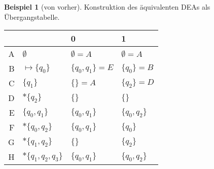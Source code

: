 \documentclass[11pt]{article} %
\theoremstyle{definition}
\newtheorem*{beispiel}{Beispiel}
\begin{document}
\begin{beispiel}[von vorher]
Konstruktion des äquivalenten DEAs als Übergangstabelle.

\begin{tabular}{rl|ll}
&& 0 & 1\\
\hline
A&$\emptyset$ & $\emptyset = A$ & $\emptyset = A$   \\
B&$\mapsto\{q_0\}$ & $\{q_0, q_1\} = E$ & $\{q_0\} = B$ \\
C&$\{q_1\}$ & $\{\} = A$ & $\{q_2\} = D$ \\
D&$*\{q_2\}$ & $\{\}$ & $\{\}$ \\
E&$\{q_0, q_1\}$ & $\{q_0, q_1\}$ & $\{q_0, q_2\}$ \\
F&$*\{q_0, q_2\}$ & $\{q_0,q_1\}$ & $\{q_0\}$ \\
G&$*\{q_1, q_2\}$ & $\{\}$ & $\{q_2\}$ \\
H&$*\{q_1, q_2, q_3\}$ & $\{q_0, q_1\}$ & $\{q_0,q_2\}$ \\
\end{tabular}


\end{beispiel}
\end{document}
